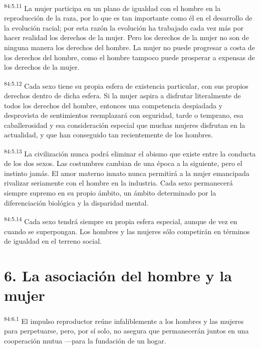 \par
\textsuperscript{84:5.11} La mujer participa en un plano de igualdad con el hombre en la reproducción de la raza, por lo que es tan importante como él en el desarrollo de la evolución racial; por esta razón la evolución ha trabajado cada vez más por hacer realidad los derechos de la mujer. Pero los derechos de la mujer no son de ninguna manera los derechos del hombre. La mujer no puede progresar a costa de los derechos del hombre, como el hombre tampoco puede prosperar a expensas de los derechos de la mujer.

\par
\textsuperscript{84:5.12} Cada sexo tiene su propia esfera de existencia particular, con sus propios derechos dentro de dicha esfera. Si la mujer aspira a disfrutar literalmente de todos los derechos del hombre, entonces una competencia despiadada y desprovista de sentimientos reemplazará con seguridad, tarde o temprano, esa caballerosidad y esa consideración especial que muchas mujeres disfrutan en la actualidad, y que han conseguido tan recientemente de los hombres.

\par
\textsuperscript{84:5.13} La civilización nunca podrá eliminar el abismo que existe entre la conducta de los dos sexos. Las costumbres cambian de una época a la siguiente, pero el instinto jamás. El amor materno innato nunca permitirá a la mujer emancipada rivalizar seriamente con el hombre en la industria. Cada sexo permanecerá siempre supremo en su propio ámbito, un ámbito determinado por la diferenciación biológica y la disparidad mental.

\par
\textsuperscript{84:5.14} Cada sexo tendrá siempre su propia esfera especial, aunque de vez en cuando se superpongan. Los hombres y las mujeres sólo competirán en términos de igualdad en el terreno social.

\section*{6. La asociación del hombre y la mujer}
\par
\textsuperscript{84:6.1} El impulso reproductor reúne infaliblemente a los hombres y las mujeres para perpetuarse, pero, por sí solo, no asegura que permanecerán juntos en una cooperación mutua ---para la fundación de un hogar.

